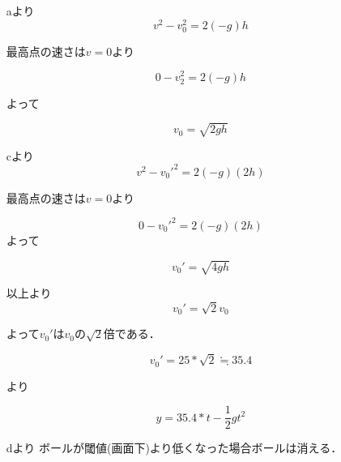 \begin{itemize}
    \item[aより]
        \begin{equation}
            v^2-v_0^2=2(-g)h
        \end{equation}

        最高点の速さは$v=0$より 

        \begin{equation}
            0-v_2^2=2(-g)h
        \end{equation}

        よって

        \begin{equation}
            v_0=\sqrt{2gh}
        \end{equation}

    \item[cより]
        \begin{equation}
            v^2-v_0'^2=2(-g)(2h)
        \end{equation}

        最高点の速さは$v=0$より 

        \begin{equation}
            0-v_0'^2=2(-g)(2h)
        \end{equation}
        よって

        \begin{equation}
            v_0'=\sqrt{4gh}
        \end{equation}

    \item[以上より]
        \begin{equation}
            v_0'=\sqrt{2}v_0
        \end{equation}

        よって$v_0'$は$v_0$の$\sqrt{2}$倍である． 

        \begin{equation}
            v_0'=25*\sqrt{2} \fallingdotseq 35.4 
        \end{equation}

        より

        \begin{equation}
            y=35.4*t-\frac{1}{2}gt^2
        \end{equation}

    \item[dより] ボールが閾値(画面下)より低くなった場合ボールは消える． 

\end{itemize}

